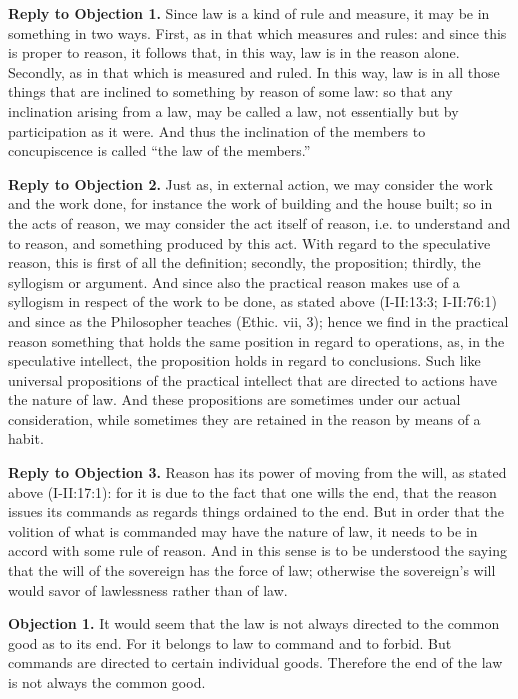 \textbf{Reply to Objection 1.} Since law is a kind of rule and measure, it may be in something in two ways. First, as in that which measures and rules: and since this is proper to reason, it follows that, in this way, law is in the reason alone. Secondly, as in that which is measured and ruled. In this way, law is in all those things that are inclined to something by reason of some law: so that any inclination arising from a law, may be called a law, not essentially but by participation as it were. And thus the inclination of the members to concupiscence is called ``the law of the members.''

\textbf{Reply to Objection 2.} Just as, in external action, we may consider the work and the work done, for instance the work of building and the house built; so in the acts of reason, we may consider the act itself of reason, i.e. to understand and to reason, and something produced by this act. With regard to the speculative reason, this is first of all the definition; secondly, the proposition; thirdly, the syllogism or argument. And since also the practical reason makes use of a syllogism in respect of the work to be done, as stated above (I-II:13:3; I-II:76:1) and since as the Philosopher teaches (Ethic. vii, 3); hence we find in the practical reason something that holds the same position in regard to operations, as, in the speculative intellect, the proposition holds in regard to conclusions. Such like universal propositions of the practical intellect that are directed to actions have the nature of law. And these propositions are sometimes under our actual consideration, while sometimes they are retained in the reason by means of a habit.

\textbf{Reply to Objection 3.} Reason has its power of moving from the will, as stated above (I-II:17:1): for it is due to the fact that one wills the end, that the reason issues its commands as regards things ordained to the end. But in order that the volition of what is commanded may have the nature of law, it needs to be in accord with some rule of reason. And in this sense is to be understood the saying that the will of the sovereign has the force of law; otherwise the sovereign's will would savor of lawlessness rather than of law.


\textbf{Objection 1.} It would seem that the law is not always directed to the common good as to its end. For it belongs to law to command and to forbid. But commands are directed to certain individual goods. Therefore the end of the law is not always the common good.

